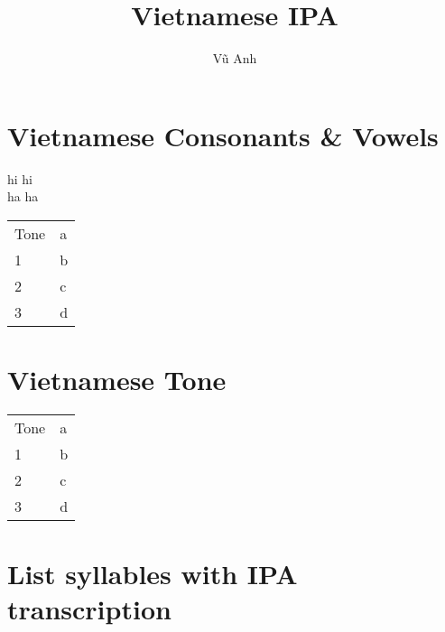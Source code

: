 \documentclass[landscape]{book}
\title{Vietnamese IPA}
\author{Vũ Anh}
\begin{document}
\maketitle

\chapter{Vietnamese Consonants \& Vowels}

hi hi \\

ha ha \\

\begin{center}
\begin{table*}[htbp]
\begin{tabular}{ll}{}
Tone & a \\
1    & b \\
2    & c \\
3    & d
\end{tabular}
\end{table*}
\end{center}

\chapter{Vietnamese Tone}
\begin{table}[]
\begin{tabular}{ll}
Tone & a \\
1    & b \\
2    & c \\
3    & d
\end{tabular}
\end{table}

\chapter{List syllables with IPA transcription}
\begin{multicols*}{5}
\noindent
\end{multicols*}
\end{document}
